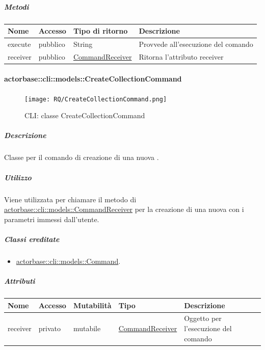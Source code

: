 \documentclass{scalatekids-article}
\begin{document}
\subparagraph{Metodi}

\begin{tabular}{| l | l | l | l |}
  \hline
  Nome & Accesso & Tipo di ritorno & Descrizione\\
  \hline
  execute & pubblico & String & Provvede all'esecuzione del comando\\
  \hline
  receiver & pubblico & \hyperref[sec:actorbase::cli::models::CommandReceiver]{CommandReceiver} & Ritorna l'attributo receiver\\
  \hline
\end{tabular}

\paragraph{actorbase::cli::models::CreateCollectionCommand}
\label{sec:actorbase::cli::models::CreateCollectionCommand}

\begin{figure}[H]
  \begin{center}
    \texttt{[image: RQ/CreateCollectionCommand.png]}
    \caption{CLI: classe CreateCollectionCommand}
  \end{center}
\end{figure}

\subparagraph{Descrizione}

Classe per il comando di creazione di una nuova .

\subparagraph{Utilizzo}

Viene utilizzata per chiamare il metodo di
\hyperref[sec:actorbase::cli::models::CommandReceiver]{actorbase::cli::models::CommandReceiver} per la creazione di una nuova
 con i parametri immessi dall'utente.

\subparagraph{Classi ereditate}

\begin{itemize}
\item \hyperref[sec:actorbase::cli::models::Command]{actorbase::cli::models::Command}.
\end{itemize}

\subparagraph{Attributi}

\begin{tabular}{| p{1cm} | p{1.5cm} | p{2cm} | p{4cm} | p{8.5cm} |}
  \hline
  Nome & Accesso & Mutabilità & Tipo & Descrizione\\
  \hline
  receiver & privato & mutabile & \hyperref[sec:actorbase::cli::models::CommandReceiver]{CommandReceiver} & Oggetto per l'esecuzione del comando\\
  \hline
\end{tabular}
\end{document}
